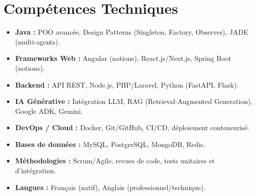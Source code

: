 \documentclass[a4paper,11pt]{article}
\begin{document}
\section{Compétences Techniques}
\begin{itemize}[leftmargin=*, nosep]
    \item \small{\textbf{Java :} POO avancée, Design Patterns (Singleton, Factory, Observer), JADE (multi-agents).}
    \item \small{\textbf{Frameworks Web :} Angular (notions), React.js/Next.js, Spring Boot (notions).}
    \item \small{\textbf{Backend :} API REST, Node.js, PHP/Laravel, Python (FastAPI, Flask).}
    \item \small{\textbf{IA Générative :} Intégration LLM, RAG (Retrieval-Augmented Generation), Google ADK, Gemini.}
    \item \small{\textbf{DevOps / Cloud :} Docker, Git/GitHub, CI/CD, déploiement conteneurisé.}
    \item \small{\textbf{Bases de données :} MySQL, PostgreSQL, MongoDB, Redis.}
    \item \small{\textbf{Méthodologies :} Scrum/Agile, revues de code, tests unitaires et d'intégration.}
    \item \small{\textbf{Langues :} Français (natif), Anglais (professionnel/technique).}
\end{itemize}

\end{document}
